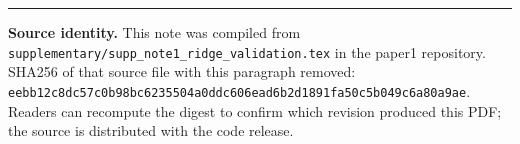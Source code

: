 \documentclass[11pt,a4paper]{article}
\begin{document}
\vspace{10pt}
\noindent\rule{\textwidth}{0.4pt}
\footnotesize\textbf{Source identity.} This note was compiled from \texttt{supplementary/supp\_note1\_ridge\_validation.tex} in the paper1 repository. SHA256 of that source file with this paragraph removed: \texttt{eebb12c8dc57c0b98bc6235504a0ddc606ead6b2d1891fa50c5b049c6a80a9ae}. Readers can recompute the digest to confirm which revision produced this PDF; the source is distributed with the code release.
\end{document}
